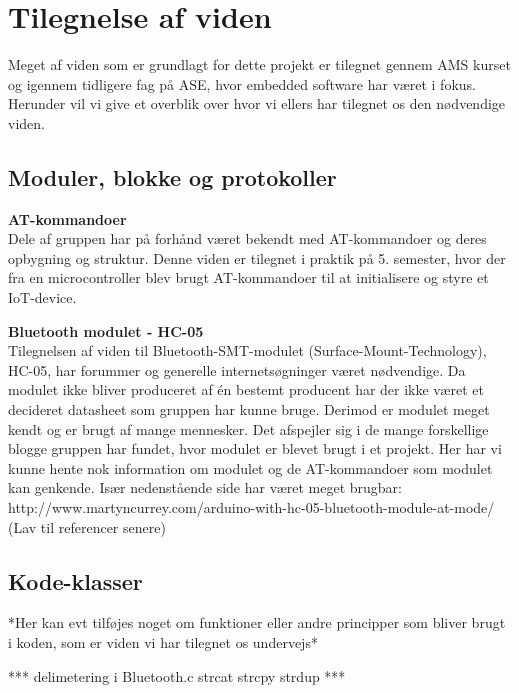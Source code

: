 \graphicspath{{Chapters/Alternative/}}


\section{Tilegnelse af viden}

Meget af viden som er grundlagt for dette projekt er tilegnet gennem AMS kurset og igennem tidligere fag på ASE, hvor embedded software har været i fokus. Herunder vil vi give et overblik over hvor vi ellers har tilegnet os den nødvendige viden.

\subsection{Moduler, blokke og protokoller}
  
\textbf{AT-kommandoer} \\
Dele af gruppen har på forhånd været bekendt med AT-kommandoer og deres opbygning og struktur. Denne viden er tilegnet i praktik på 5. semester, hvor der fra en microcontroller blev brugt AT-kommandoer til at initialisere og styre et IoT-device.

\textbf{Bluetooth modulet - HC-05}\\
Tilegnelsen af viden til Bluetooth-SMT-modulet (Surface-Mount-Technology), HC-05, har forummer og generelle internetsøgninger været nødvendige. Da modulet ikke bliver produceret af én bestemt producent har der ikke været et decideret datasheet som gruppen har kunne bruge. Derimod er modulet meget kendt og er brugt af mange mennesker. Det afspejler sig i de mange forskellige blogge gruppen har fundet, hvor modulet er blevet brugt i et projekt. Her har vi kunne hente nok information om modulet og de AT-kommandoer som modulet kan genkende.
Især nedenstående side har været meget brugbar:
http://www.martyncurrey.com/arduino-with-hc-05-bluetooth-module-at-mode/
(Lav til referencer senere)

\subsection{Kode-klasser}
*Her kan evt tilføjes noget om funktioner eller andre principper som bliver brugt i koden, som er viden vi har tilegnet os undervejs*

*** delimetering i Bluetooth.c
strcat
strcpy
strdup ***


